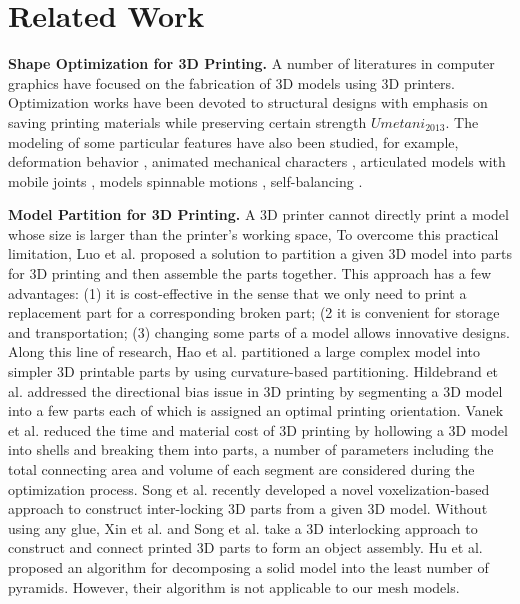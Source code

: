 \section{Related Work} 

\textbf{Shape Optimization for 3D Printing.} A number of literatures in computer graphics have focused on the fabrication of 3D models using 3D printers. Optimization works have been devoted to structural designs with emphasis on saving printing materials while preserving certain strength \cite{StavaVBCM12,ZhouPZ13,WangWYLTTDCL13,LuSZWFCSTCC14} $Umetani_2013$. The modeling of some particular features have also been studied, for example, deformation behavior \cite{SkourasTCBG13}, animated mechanical characters \cite{CorosTNSFSMB13,CeylanLMAP13}, articulated models with mobile joints \cite{BacherBJP12,CaliCAKSKW12}, models spinnable motions \cite{Bacher14}, self-balancing \cite{PrevostWLS13}.

\textbf{Model Partition for 3D Printing.} A 3D printer cannot directly print a model whose size is larger than the printer's working space, To overcome this practical limitation, Luo et al. \cite{LuoBRM12} proposed a solution to partition a given 3D model into parts for 3D printing and then assemble the parts together. This approach has a few advantages: (1) it is cost-effective in the sense that we only need to print a replacement part for a corresponding broken part; (2 it is convenient for storage and transportation; (3) changing some parts of a model allows innovative designs. Along this line of research, Hao et al. \cite{hao2011efficient} partitioned a large complex model into simpler 3D printable parts by using curvature-based partitioning. Hildebrand et al. \cite{HildebrandBA13} addressed the directional bias issue in 3D printing by segmenting a 3D model into a few parts each of which is assigned an optimal printing orientation. Vanek et al. \cite{VanekGBMCSM14} reduced the time and material cost of 3D printing by hollowing a 3D model into shells and breaking them into parts, a number of parameters including the total connecting area and volume of each segment are considered during the optimization process. Song et al. \cite{SongFLF15} recently developed a novel voxelization-based approach to construct inter-locking 3D parts from a given 3D model. Without using any glue, Xin et al. \cite{XinLFWHC11} and Song et al. \cite{SongFC12} take a 3D interlocking approach to construct and connect printed 3D parts to form an object assembly. Hu et al. \cite{Hu_siga14} proposed an algorithm for decomposing a solid model into the least number of pyramids. However, their algorithm is not applicable to our mesh models.
